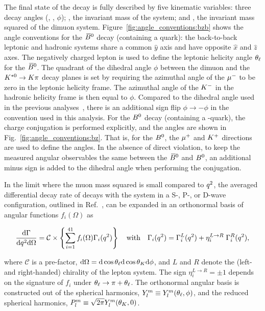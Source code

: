 The final state of the decay \BdToKpimm is fully described by five kinematic variables: three decay angles (\thetal, \thetak, $\phi$); \mkpi, the invariant mass of the \Kp\pim system; and \qsq, the invariant mass squared of the dimuon system. 
Figure~\ref{fig:angle_conventions:bzb} shows the angle conventions for the ${{\kern 0.18em\overline{\kern -0.18em B}{}}{}^0}$ decay (containing a \bquark quark): the back-to-back leptonic and hadronic systems share a common $\hat{y}$ axis and have opposite $\hat{x}$ and $\hat{z}$ axes. 
The negatively charged lepton is used to define the leptonic helicity angle $\theta_\ell$ for the ${{\kern 0.18em\overline{\kern -0.18em B}{}}{}^0}$.
The quadrant of the dihedral angle $\phi$ between the dimuon and the ${{K}^{*0}} \rightarrow K\pi$ decay planes is set by requiring the azimuthal angle of the ${\mu^-}$ to be zero in the leptonic helicity frame. The azimuthal angle of the ${{K}^-}$ in the hadronic helicity frame is then equal to $\phi$. Compared to the dihedral angle used in the previous \lhcb analyses~\cite{LHCB-PAPER-2011-020,LHCB-PAPER-2013-019,LHCB-PAPER-2013-037,LHCB-PAPER-2015-051}, there is an additional sign flip $\phi \to -\phi$ in the convention used in this analysis. For the ${{B}^0}$ decay (containing a \bquarkbar-quark), the charge conjugation is performed explicitly, and the angles are shown in Fig.~\ref{fig:angle_conventions:bz}. That is, for the ${{B}^0}$, the ${\mu^+}$ and ${{K}^+}$ directions are used to define the angles. In the absence of direct \CP violation, to keep the measured angular observables the same between the ${{\kern 0.18em\overline{\kern -0.18em B}{}}{}^0}$ and ${{B}^0}$, an additional minus sign is added to the dihedral angle when performing the \CP conjugation.

In the limit where the muon mass squared is small compared to ${q^2}$, the \CP averaged differential decay rate of \BdToKpimm decays with the \Kp\pim system in a S-, P-, or D-wave configuration, outlined in Ref.~\cite{biplab}, can be expanded in an orthonormal basis of angular functions $f_i(\Omega)$ as

\begin{equation}
\label{eqn:vector_moments}
\frac{\mathrm{d}\Gamma }{\mathrm{d}{q^2} \mathrm{d}\Omega} = \mathcal{C} \times \left\{ \displaystyle \sum^{41}_{i=1} f_i (\Omega) \Gamma_i({q^2}) \right\} 
 \quad\mbox{with}\quad
\Gamma_i({q^2}) = \Gamma^L_i({q^2}) + \eta^{L\rightarrow R}_i\; \Gamma^R_i({q^2}),
\end{equation}

\noindent where $\mathcal{C}$ is a pre-factor, $\mathrm{d}\Omega = \mathrm{d}\cos{\theta_\ell} \mathrm{d}\cos{\theta_K} \mathrm{d}\phi$, and $L$ and $R$ denote the (left- and right-handed) chirality of the lepton system. The sign $\eta^{L\to R}_i=\pm 1$ depends on the signature of $f_i$ under $\theta_\ell \rightarrow \pi + \theta_\ell$. 
\noindent The orthonormal angular basis is constructed out of the spherical harmonics, \mbox{$Y^m_l \equiv Y^m_l (\theta_\ell,\phi)$}, and the reduced spherical harmonics, \mbox{${P^m_l \equiv \sqrt{2 \pi}Y^m_l(\theta_K,0)}$}.
 
